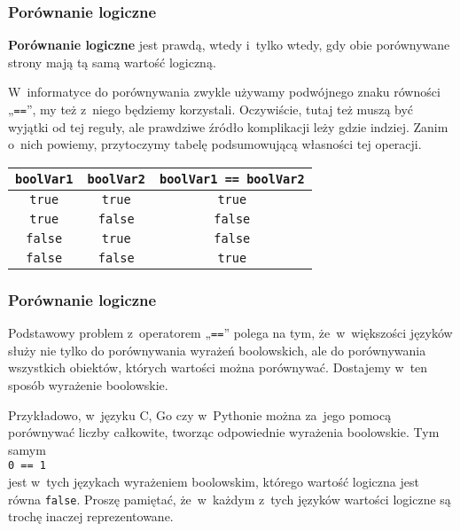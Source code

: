 \documentclass[10pt,t]{beamer}
\begin{document}
\begin{frame}
  \frametitle{Porównanie logiczne}


  \textbf{Porównanie logiczne} jest prawdą, wtedy i~tylko wtedy, gdy obie
  porównywane strony mają tą samą wartość logiczną.

  W~informatyce do porównywania zwykle używamy podwójnego znaku równości
  „\texttt{==}”, my też z~niego będziemy korzystali. Oczywiście, tutaj też
  muszą być wyjątki od tej reguły, ale prawdziwe źródło komplikacji
  leży gdzie indziej. Zanim o~nich powiemy, przytoczymy tabelę
  podsumowującą własności tej operacji.

  \vspace{1em}





  \begingroup

  \centering

  \begin{tabular}{|c|c|c|}
    \hline
    \texttt{boolVar1} & \texttt{boolVar2}
    & \texttt{boolVar1 == boolVar2} \\
    \hline
    \texttt{true}  & \texttt{true}  & \texttt{true}  \\
    \texttt{true}  & \texttt{false} & \texttt{false} \\
    \texttt{false} & \texttt{true}  & \texttt{false} \\
    \texttt{false} & \texttt{false} & \texttt{true}  \\
    \hline
  \end{tabular}

  \endgroup

\end{frame}





\begin{frame}
  \frametitle{Porównanie logiczne}


  Podstawowy problem z~operatorem „\texttt{==}” polega na tym,
  że~w~większości języków służy nie tylko do porównywania wyrażeń
  boolowskich, ale do porównywania wszystkich obiektów, których wartości
  można porównywać. Dostajemy w~ten sposób wyrażenie boolowskie.

  Przykładowo, w~języku C, Go czy w~Pythonie można za~jego pomocą
  porównywać liczby całkowite, tworząc odpowiednie wyrażenia boolowskie.
  Tym samym \\
  \texttt{0 == 1} \\
  jest w~tych językach wyrażeniem boolowskim, którego wartość logiczna jest
  równa \texttt{false}. Proszę pamiętać, że~w~każdym z~tych języków
  wartości logiczne są trochę inaczej reprezentowane.

\end{frame}
\end{document}

